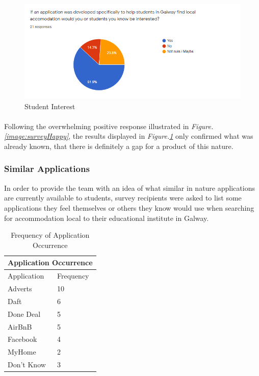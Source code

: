 \begin{figure}[H]
	\caption{Student Interest}
	\label{image:surveyInterest}
	\centering
	\includegraphics[width=1\textwidth]{images/survey_interest.png}
\end{figure}

\paragraph{}
Following the overwhelming positive response illustrated in \textit{Figure.\ref{image:surveyHappy}}, the results displayed in \textit{Figure.\ref{image:surveyInterest}} only confirmed what was already known, that there is definitely a gap for a product of this nature.

\subsubsection{Similar Applications}
In order to provide the team with an idea of what similar in nature applications are currently available to students, survey recipients were asked to list some applications they feel themselves or others they know would use when searching for accommodation local to their educational institute in Galway.
\begin{table}[H]
\centering
\begin{tabular}{ |p{3cm}||p{3cm}| }

 \hline
 \multicolumn{2}{|c|}{Application Occurrence} \\
 \hline
 Application & Frequency \\
 \hline
 Adverts   & 10    \\
 Daft &   6    \\
 Done Deal & 5 \\
 AirBnB    & 5 \\
 Facebook &  4  \\
 MyHome & 2 \\
 Don't Know & 3  \\
 \hline
 
\end{tabular}
\caption{Frequency of Application Occurrence}
\label{table:1}
\end{table}

